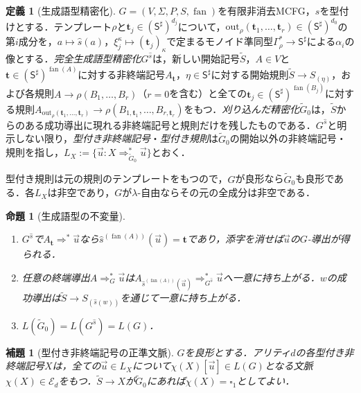 \documentclass[11pt,a4paper]{ltjsarticle}
\numberwithin{equation}{section}
\theoremstyle{plain}
\newtheorem{lemma}[theorem]{補題}
\newtheorem{proposition}[theorem]{命題}
\theoremstyle{definition}
\newtheorem{definition}[theorem]{定義}
\theoremstyle{remark}
\newcommand{\out}{\mathrm{out}}
\newcommand{\tuple}[1]{\vec{#1}}
\newcommand{\blank}{\square}
\newcommand{\fan}{\operatorname{fan}}
\begin{document}
\begin{definition}[生成語型精密化]
\label{def:output-refinement}
$G=(V,\Sigma,P,S,\fan)$を有限非消去MCFG，$s$を型付けとする．テンプレート$\rho$と$\mathbf t_j\in(\mathsf S^\sharp)^{d_j}$について，$\out_\rho(\mathbf t_1,\ldots,\mathbf t_r)\in(\mathsf S^\sharp)^{d_0}$の第$i$成分を，$a\mapsto\widehat{s}(a)$，$\xi_j^\kappa\mapsto(\mathbf t_j)_\kappa$で定まるモノイド準同型$\Gamma_\rho^*\to\mathsf S^\sharp$による$\alpha_i$の像とする．\emph{完全生成語型精密化}$G^{\widehat{s}}$は，新しい開始記号$\widetilde S$，$A\in V$と$\mathbf t\in(\mathsf S^\sharp)^{\fan(A)}$に対する非終端記号$A_{\mathbf t}$，$\eta\in\mathsf S^\sharp$に対する開始規則$\widetilde S\to S_{(\eta)}$，および各規則$A\to\rho(B_1,\ldots,B_r)$（$r=0$を含む）と全ての$\mathbf t_j\in(\mathsf S^\sharp)^{\fan(B_j)}$に対する規則$A_{\out_\rho(\mathbf t_1,\ldots,\mathbf t_r)}\to\rho(B_{1,\mathbf t_1},\ldots,B_{r,\mathbf t_r})$をもつ．\emph{刈り込んだ精密化}$\widetilde G_0$は，$\widetilde S$からのある成功導出に現れる非終端記号と規則だけを残したものである．$G^{\widehat{s}}$と明示しない限り，\emph{型付き非終端記号}・\emph{型付き規則}は$\widetilde G_0$の開始以外の非終端記号・規則を指し，$L_X:=\{\tuple u:X\Rightarrow_{\widetilde G_0}^*\tuple u\}$とおく．
\end{definition}

型付き規則は元の規則のテンプレートをもつので，$G$が良形なら$\widetilde G_0$も良形である．各$L_X$は非空であり，$G$が$\lambda$-自由ならその元の全成分は非空である．

\begin{proposition}[生成語型の不変量]
\label{prop:output-invariants}
\begin{enumerate}[label=(\roman*),leftmargin=*]
\item $G^{\widehat{s}}$で$A_{\mathbf t}\Rightarrow^*\tuple u$なら$\widehat{s}^{(\fan(A))}(\tuple u)=\mathbf t$であり，添字を消せば$\tuple u$の$G$-導出が得られる．
\item 任意の終端導出$A\Rightarrow_G^*\tuple u$は$A_{\widehat{s}^{(\fan(A))}(\tuple u)}\Rightarrow_{G^{\widehat{s}}}^*\tuple u$へ一意に持ち上がる．$w$の成功導出は$\widetilde S\to S_{(\widehat{s}(w))}$を通じて一意に持ち上がる．
\item $L(\widetilde G_0)=L(G^{\widehat{s}})=L(G)$．
\end{enumerate}
\end{proposition}

\begin{lemma}[型付き非終端記号の正準文脈]
\label{lem:identity-canonical-contexts}
$G$を良形とする．アリティ$d$の各型付き非終端記号$X$は，全ての$\tuple u\in L_X$について$\chi(X)[\tuple u]\in L(G)$となる文脈$\chi(X)\in\mathcal E_d$をもつ．$\widetilde S\to X$が$\widetilde G_0$にあれば$\chi(X)=\blank_1$としてよい．
\end{lemma}
\end{document}
